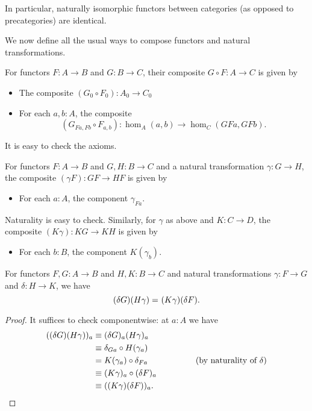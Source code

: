 In particular, naturally isomorphic functors between categories (as opposed to precategories) are identical.

\medskip

We now define all the usual ways to compose functors and natural transformations.

\begin{defn}
  For functors $F:A\to B$ and $G:B\to C$, their composite $G\circ F:A\to C$ is given by
  \begin{itemize}
  \item The composite $(G_0\circ F_0) : A_0 \to C_0$
  \item For each $a,b:A$, the composite
    \[(G_{Fa,Fb}\circ F_{a,b}):\hom_A(a,b) \to \hom_C(GFa,GFb).\]
  \end{itemize}
  It is easy to check the axioms.
\end{defn}

\begin{defn}
  For functors $F:A\to B$ and $G,H:B\to C$ and a natural transformation $\gamma:G\to H$, the composite $(\gamma F):GF\to HF$ is given by
  \begin{itemize}
  \item For each $a:A$, the component $\gamma_{Fa}$.
  \end{itemize}
  Naturality is easy to check.
  Similarly, for $\gamma$ as above and $K:C\to D$, the composite $(K\gamma):KG\to KH$ is given by
  \begin{itemize}
  \item For each $b:B$, the component $K(\gamma_b)$.
  \end{itemize}
\end{defn}

\begin{lem}\label{ct:interchange}
  For functors $F,G:A\to B$ and $H,K:B\to C$ and natural transformations $\gamma:F\to G$ and $\delta:H\to K$, we have
  \[(\delta G)(H\gamma) =_{} (K\gamma)(\delta F).\]
\end{lem}
\begin{proof}
  It suffices to check componentwise: at $a:A$ we have
  \begin{align*}
    ((\delta G)(H\gamma))_a
    &\equiv (\delta G)_{a}(H\gamma)_a\\
    &\equiv \delta_{Ga}\circ H(\gamma_a)\\
    &= K(\gamma_a) \circ \delta_{Fa} \hspace{2cm}\text{(by naturality of $\delta$)}\\
    &\equiv (K \gamma)_a\circ (\delta F)_a\\
    &\equiv ((K \gamma)(\delta F))_a.\qedhere
  \end{align*}
\end{proof}

